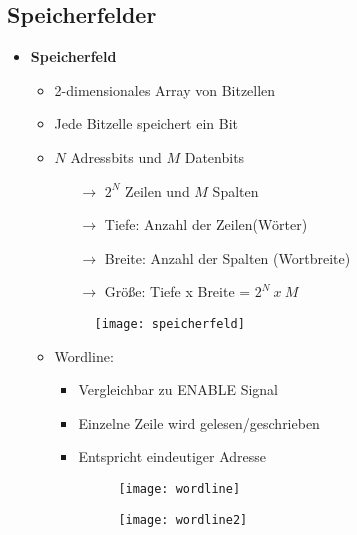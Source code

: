 \subsection{Speicherfelder}
\begin{itemize}

\item \textbf{Speicherfeld}
	\begin{itemize}
	\item 2-dimensionales Array von Bitzellen
	\item Jede Bitzelle speichert ein Bit
	\item $N$ Adressbits und $M$ Datenbits
		\begin{itemize}
		\item[$\rightarrow$] $2^N$ Zeilen und $M$ Spalten
		\item[$\rightarrow$] Tiefe: Anzahl der Zeilen(Wörter)
		\item[$\rightarrow$] Breite: Anzahl der Spalten (Wortbreite)
		\item[$\rightarrow$] Größe: Tiefe x Breite = $2^N~x~M$
		\end{itemize}
	\item[]
		\begin{figure}[H]
		\begin{center}
		\texttt{[image: speicherfeld]}
		\end{center}
		\end{figure}
		
	\item Wordline:
		\begin{itemize}
		\item Vergleichbar zu ENABLE Signal
		\item Einzelne Zeile wird gelesen/geschrieben
		\item Entspricht eindeutiger Adresse
		\item[]
			\begin{minipage}{0.4\textwidth}
				\begin{figure}[H]
				\texttt{[image: wordline]}
				\end{figure}
			\end{minipage}
			\begin{minipage}[t]{0.45\textwidth}
				\vspace{-1.75cm}
				\begin{figure}[H]
				\texttt{[image: wordline2]}
				\end{figure}
			\end{minipage}
		\end{itemize}
	\end{itemize}


\end{itemize}
